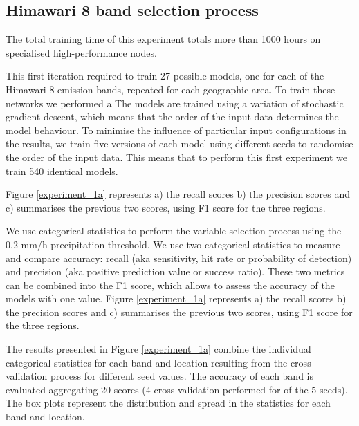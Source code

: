\documentclass[3p,times]{elsarticle}
\begin{document}
\subsection{Himawari 8 band selection process}

The total training time of this experiment totals more than 1000 hours on specialised high-performance nodes.

This first iteration required to train 27 possible models, one for each of the Himawari 8 emission bands, repeated for each geographic area. To train these networks we performed a  The models are trained using a variation of stochastic gradient descent, which means that the order of the input data determines the model behaviour. To minimise the influence of particular input configurations in the results, we train five versions of each model using different seeds to randomise the order of the input data. This means that to perform this first experiment we train 540 identical models. 

 Figure \ref{experiment_1a} represents a) the recall scores b) the precision scores and c) summarises the previous two scores, using F1 score for the three regions.

We use categorical statistics to perform the variable selection process using the 0.2 mm/h precipitation threshold. We use two categorical statistics to measure and compare accuracy: recall (aka sensitivity, hit rate or probability of detection) and precision (aka positive prediction value or success ratio). These two metrics can be combined into the F1 score, which allows to assess the accuracy of the models with one value. Figure \ref{experiment_1a} represents a) the recall scores b) the precision scores and c) summarises the previous two scores, using F1 score for the three regions.

The results presented in Figure \ref{experiment_1a} combine the individual categorical statistics for each band and location resulting from the cross-validation process for different seed values. The accuracy of each band is evaluated aggregating 20 scores (4 cross-validation performed for of the 5 seeds). The box plots represent the distribution and spread in the statistics for each band and location. %
\end{document}
